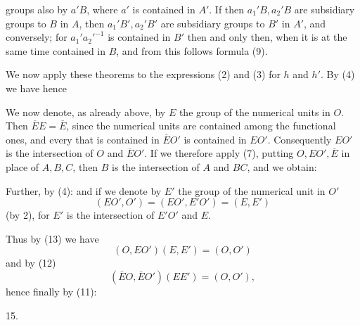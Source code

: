 groups also by $a'B$, where $a'$ is contained in $A'$. If then $a_1'B, a_2'B$ are  subsidiary groups to $B$ in $A$, then $a_1'B', a_2'B'$ are  subsidiary groups to $B'$ in $A'$, and conversely; for $a_1'a_2'^{-1}$ is contained in $B'$ then and only then, when it is at the same time contained in $B$, and from this follows formula (9).

We now apply these theorems to the expressions (2) and (3) for $h$ and $h'$. By (4) we have
hence

We now denote, as already above, by $E$ the group of the numerical units in $O$. Then $\overline{E}E = \overline{E}$, since the numerical units are contained among the functional ones, and every  that is contained in $\overline{E}O'$ is contained in $EO'$. Consequently $EO'$ is the intersection of $O$ and $\overline{E}O'$. If we therefore apply (7), putting $O, EO', \overline{E}$ in place of $A, B, C$, then $B$ is the intersection of $A$ and $BC$, and we obtain:

Further, by (4):
and if we denote by $E'$ the group of the numerical unit in $O'$ %
\[
(EO', O') = (EO', E'O') = (E, E')
\]
(by 2), for $E'$ is the intersection of $E'O'$ and $E$.

Thus by (13) we have
\[
(O, EO')(E, E') = (O, O')
\]
and by (12)
\[
(\overline{E}O, \overline{E}O')(EE') = (O, O'), %
\]
hence finally by (11):

15. 
